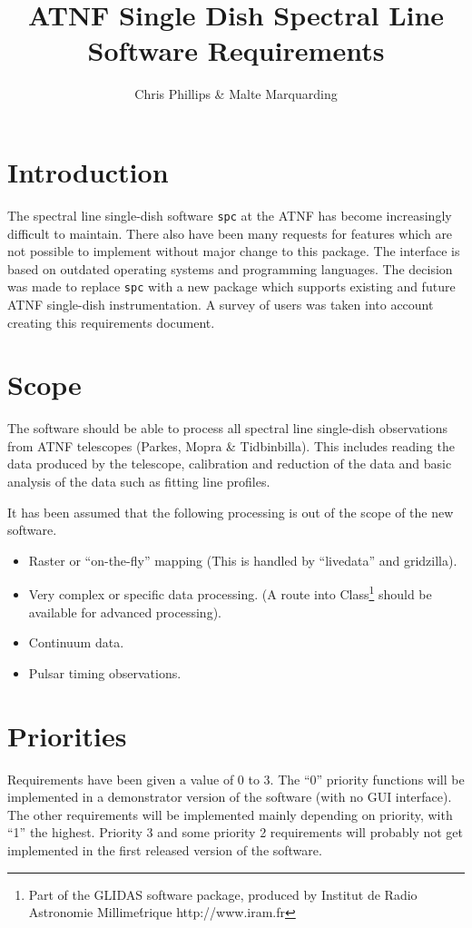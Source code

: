 \documentclass[11pt]{article}
\title{ATNF Single Dish Spectral Line Software Requirements }
\author{Chris Phillips \& Malte Marquarding}
\newcounter{requirement}
\let\oldsection\section
\renewcommand{\section}[1]{\setcounter{requirement}{0}\oldsection{#1}}
\begin{document}
\maketitle

\section{Introduction}

The spectral line single-dish software {\tt spc} at the ATNF has
become increasingly difficult to maintain. There also have been many
requests for features which are not possible to implement without
major change to this package. The interface is based on outdated
operating systems and programming languages. The decision was made to
replace {\tt spc} with a new package which supports existing and
future ATNF single-dish instrumentation. A survey of users was taken
into account creating this requirements document.

\section{Scope}

The software should be able to process all spectral line single-dish
observations from ATNF telescopes (Parkes, Mopra \& Tidbinbilla). This
includes reading the data produced by the telescope, calibration and
reduction of the data and basic analysis of the data such as fitting
line profiles.

It has been assumed that the following processing is out of the scope
of the new software.
\begin{itemize}
\item Raster or ``on-the-fly'' mapping (This is handled by
``livedata'' and gridzilla).
\item Very complex or specific data processing. (A route into
  Class\footnote{Part of the GLIDAS software package, produced by
  Institut de Radio Astronomie Millime\'trique http://www.iram.fr}
  should be available for advanced processing).
\item Continuum data.
\item Pulsar timing observations.
\end{itemize}

\section{Priorities}

Requirements have been given a value of 0 to 3. The ``0'' priority
functions will be implemented in a demonstrator version of the
software (with no GUI interface). The other requirements will be
implemented mainly depending on priority, with ``1'' the
highest. Priority 3 and some priority 2 requirements will probably not
get implemented in the first released version of the software.
\end{document}
